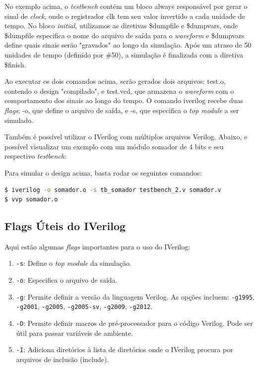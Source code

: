 \documentclass{report}
\begin{document}
No exemplo acima, o \textit{testbench} contém um bloco always responsável por gerar o sinal de \textit{clock}, onde o registrador clk tem seu valor invertido a cada unidade de tempo. No bloco \textit{initial}, utilizamos as diretivas \$dumpfile e \$dumpvars, onde \$dumpfile especifica o nome do arquivo de saída para o \textit{waveform} e \$dumpvars define quais sinais serão "gravados" ao longo da simulação. Após um atraso de 50 unidades de tempo (definido por \#50), a simulação é finalizada com a diretiva \$finish.

Ao executar os dois comandos acima, serão gerados dois arquivos: test.o, contendo o design "compilado", e test.vcd, que armazena o \textit{waveform} com o comportamento dos sinais ao longo do tempo. O comando iverilog recebe duas \textit{flags}: -o, que define o arquivo de saída, e -s, que especifica o \textit{top module} a ser simulado.

Também é possível utilizar o IVerilog com múltiplos arquivos Verilog. Abaixo, e possível visualizar um exemplo com um módulo somador de 4 bits e seu respectivo \textit{testbench}:





Para simular o design acima, basta rodar os seguintes comandos:

\begin{lstlisting}[language=bash]
$ iverilog -o somador.o -s tb_somador testbench_2.v somador.v
$ vvp somador.o
\end{lstlisting}

\subsection{Flags Úteis do IVerilog}

Aqui estão algumas \textit{flags} importantes para o uso do IVerilog:

\begin{enumerate}
    \item \texttt{-s}: Define o \textit{top module} da simulação.
    \item \texttt{-o}: Especifica o arquivo de saída.
    \item \texttt{-g}: Permite definir a versão da linguagem Verilog. As opções incluem: \texttt{-g1995}, \texttt{-g2001}, \texttt{-g2005}, \texttt{-g2005-sv}, \texttt{-g2009}, \texttt{-g2012}.
    \item \texttt{-D}: Permite definir macros de pré-processador para o código Verilog. Pode ser útil para passar variáveis de ambiente.
    \item \texttt{-I}: Adiciona diretórios à lista de diretórios onde o IVerilog procura por arquivos de inclusão (include).
\end{enumerate}
\end{document}
